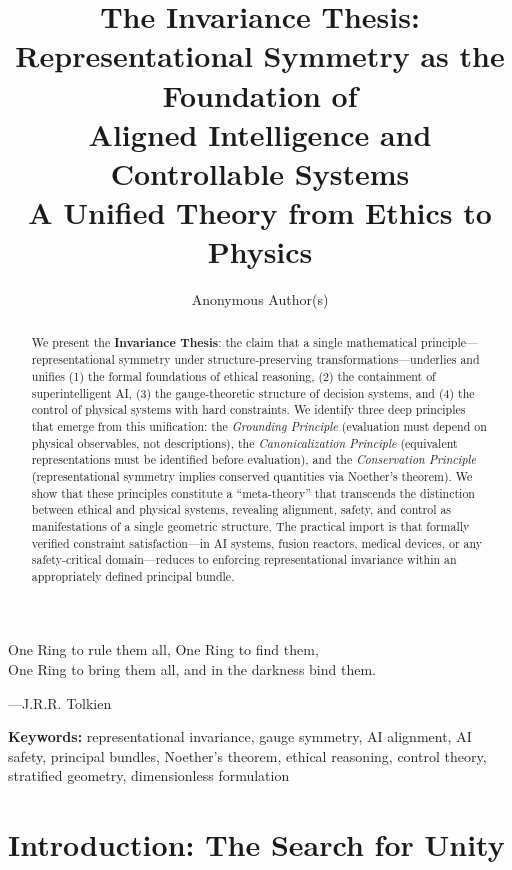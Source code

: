 \documentclass[12pt]{article}
\title{The Invariance Thesis:\\
Representational Symmetry as the Foundation of\\
Aligned Intelligence and Controllable Systems\\[0.5em]
\large A Unified Theory from Ethics to Physics}
\author{Anonymous Author(s)}
\date{}
\begin{document}
\maketitle

\begin{flushright}
\begin{minipage}{0.5\textwidth}
One Ring to rule them all, One Ring to find them,\\
One Ring to bring them all, and in the darkness bind them.

\medskip
\hfill ---J.R.R. Tolkien
\end{minipage}
\end{flushright}

\begin{abstract}
We present the \textbf{Invariance Thesis}: the claim that a single mathematical principle---representational symmetry under structure-preserving transformations---underlies and unifies (1) the formal foundations of ethical reasoning, (2) the containment of superintelligent AI, (3) the gauge-theoretic structure of decision systems, and (4) the control of physical systems with hard constraints. We identify three deep principles that emerge from this unification: the \textit{Grounding Principle} (evaluation must depend on physical observables, not descriptions), the \textit{Canonicalization Principle} (equivalent representations must be identified before evaluation), and the \textit{Conservation Principle} (representational symmetry implies conserved quantities via Noether's theorem). We show that these principles constitute a ``meta-theory'' that transcends the distinction between ethical and physical systems, revealing alignment, safety, and control as manifestations of a single geometric structure. The practical import is that formally verified constraint satisfaction---in AI systems, fusion reactors, medical devices, or any safety-critical domain---reduces to enforcing representational invariance within an appropriately defined principal bundle.
\end{abstract}

\noindent\textbf{Keywords:} representational invariance, gauge symmetry, AI alignment, AI safety, principal bundles, Noether's theorem, ethical reasoning, control theory, stratified geometry, dimensionless formulation

\tableofcontents

\section{Introduction: The Search for Unity}
\end{document}
